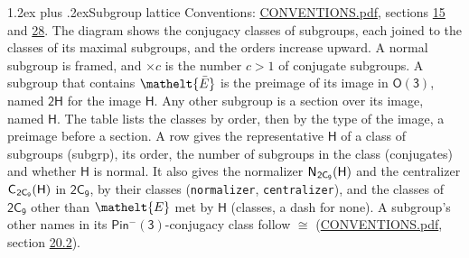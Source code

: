 \documentclass[10pt,a4paper]{article}
\makeatletter
\renewcommand\section{\@startsection{section}{1}{\z@}{-3ex plus -1ex minus -.2ex}%
  {1.2ex plus .2ex}{\normalfont\large\sffamily\bfseries\color{parttitle}}}
\numberwithin{equation}{section}
\newcommand{\eltfont}[1]{{\let\sigma\eltsigma\mathelt{#1}}}
\newcommand{\grp}[1]{\mathsf{#1}}
\newcommand{\cls}[1]{\eltfont{#1}}
\newcommand{\elt}[1]{\eltfont{#1}}
\newcommand{\samecls}{\cong}
\newcommand{\barred}[1]{\bar{#1}}
\newcommand{\hairsp}{\mkern1mu}
\makeatother
\begin{document}
\section{Subgroup lattice}\label{s:subgroups}
Conventions: \href{../../CONVENTIONS.pdf}{CONVENTIONS.pdf}, sections \href{../../../rotation/CONVENTIONS.pdf\#conv.15}{15} and \href{../../CONVENTIONS.pdf\#conv.28}{28}.
The diagram shows the conjugacy classes of subgroups, each joined to the classes of its maximal subgroups, and the orders increase upward. \label{n:index.conjugates.c}A normal subgroup is framed, and ${\times}c$ is the number $c > 1$ of conjugate subgroups. \label{n:group.H}A subgroup that contains $\elt{\barred{E}}$ is the preimage of its image in $\grp{O(3)}$, named $\grp{2H}$ for the image $\grp{H}$. Any other subgroup is a section over its image, named $\grp{H}$. The table lists the classes by order, then by the type of the image, a preimage before a section. \label{n:head.subgroup}\label{n:head.order}\label{n:head.conjugates}\label{n:head.normal}A row gives the representative $\grp{H}$ of a class of subgroups (subgrp), its order, the number of subgroups in the class (conjugates) and whether $\grp{H}$ is normal. \label{n:group.normalizer}\label{n:group.centralizer}\label{n:head.classes}It also gives the normalizer $\grp{N}_{\hairsp \grp{2C_{9}}}(\grp{H})$ and the centralizer $\grp{C}_{\hairsp \grp{2C_{9}}}(\grp{H})$ in $\grp{2C_{9}}$, by their classes (\texttt{normalizer}, \texttt{centralizer}), and the classes of $\grp{2C_{9}}$ other than $\cls{E}$ met by $\grp{H}$ (classes, a dash for none). A subgroup's other names in its \href{Pinminus3.pdf}{$\grp{Pin^{-}(3)}$}-conjugacy class follow $\samecls$ (\href{../../CONVENTIONS.pdf}{CONVENTIONS.pdf}, section \href{../../CONVENTIONS.pdf\#conv.20.2}{20.2}).
\begin{center}
\end{center}
\end{document}
